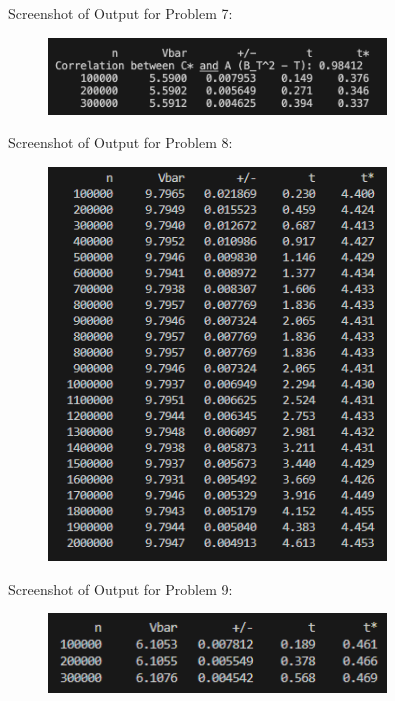 \documentclass{report}
\begin{document}
\centerline{Screenshot of Output for Problem 7:}
\begin{figure}[H]
    \centering
    \includegraphics[width=0.8\textwidth]{Screenshot_7.png}
\end{figure}
\pagebreak

\centerline{Screenshot of Output for Problem 8:}
\begin{figure}[H]
    \centering
    \includegraphics[width=0.8\textwidth]{Screenshot_8.png}
\end{figure}

\centerline{Screenshot of Output for Problem 9:}
\begin{figure}[H]
    \centering
    \includegraphics[width=0.8\textwidth]{Screenshot_9.png}
\end{figure}

\pagebreak
\end{document}

